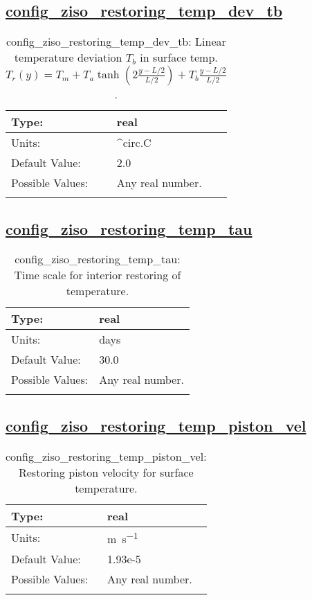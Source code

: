 \subsection[config\_ziso\_restoring\_temp\_dev\_tb]{\hyperref[sec:nm_tab_ziso]{config\_ziso\_restoring\_temp\_dev\_tb}}
\label{subsec:nm_sec_config_ziso_restoring_temp_dev_tb}
\begin{center}
\begin{longtable}{| p{2.0in} || p{4.0in} |}
    \hline
    Type: & real \\
    \hline
    Units: & \si{^{circ}.C} \\
    \hline
    Default Value: & 2.0 \\
    \hline
    Possible Values: & Any real number. \\
    \hline
    \caption{config\_ziso\_restoring\_temp\_dev\_tb: Linear temperature deviation $T_b$ in surface temp. $T_r(y) = T_m + T_a \tanh\left(2\frac{y-L/2}{L/2}\right) + T_b \frac{y-L/2}{L/2}$.}
\end{longtable}
\end{center}
\subsection[config\_ziso\_restoring\_temp\_tau]{\hyperref[sec:nm_tab_ziso]{config\_ziso\_restoring\_temp\_tau}}
\label{subsec:nm_sec_config_ziso_restoring_temp_tau}
\begin{center}
\begin{longtable}{| p{2.0in} || p{4.0in} |}
    \hline
    Type: & real \\
    \hline
    Units: & \si{days} \\
    \hline
    Default Value: & 30.0 \\
    \hline
    Possible Values: & Any real number. \\
    \hline
    \caption{config\_ziso\_restoring\_temp\_tau: Time scale for interior restoring of temperature.}
\end{longtable}
\end{center}
\subsection[config\_ziso\_restoring\_temp\_piston\_vel]{\hyperref[sec:nm_tab_ziso]{config\_ziso\_restoring\_temp\_piston\_vel}}
\label{subsec:nm_sec_config_ziso_restoring_temp_piston_vel}
\begin{center}
\begin{longtable}{| p{2.0in} || p{4.0in} |}
    \hline
    Type: & real \\
    \hline
    Units: & \si{m.s^{-1}} \\
    \hline
    Default Value: & 1.93e-5 \\
    \hline
    Possible Values: & Any real number. \\
    \hline
    \caption{config\_ziso\_restoring\_temp\_piston\_vel: Restoring piston velocity for surface temperature.}
\end{longtable}
\end{center}
